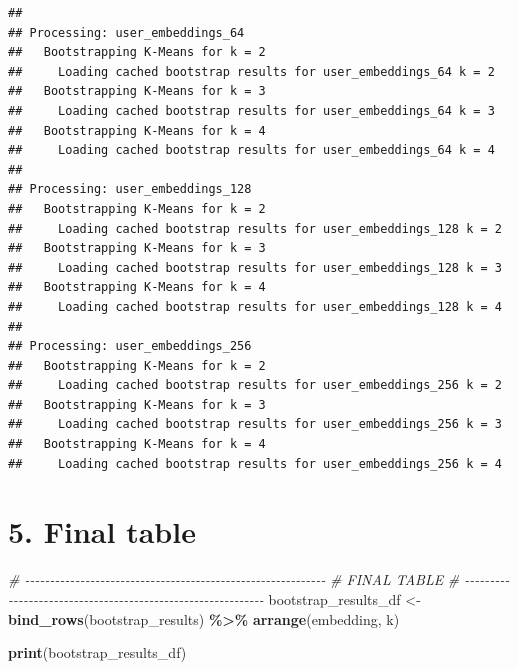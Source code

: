 \documentclass[
  11pt,
]{article}
\newenvironment{Shaded}{\begin{snugshade}}{\end{snugshade}}
\newcommand{\CommentTok}[1]{\textcolor[rgb]{0.56,0.35,0.01}{\textit{#1}}}
\newcommand{\FunctionTok}[1]{\textcolor[rgb]{0.13,0.29,0.53}{\textbf{#1}}}
\newcommand{\NormalTok}[1]{#1}
\newcommand{\OtherTok}[1]{\textcolor[rgb]{0.56,0.35,0.01}{#1}}
\newcommand{\SpecialCharTok}[1]{\textcolor[rgb]{0.81,0.36,0.00}{\textbf{#1}}}
\begin{document}
\begin{verbatim}
## 
## Processing: user_embeddings_64 
##   Bootstrapping K-Means for k = 2 
##     Loading cached bootstrap results for user_embeddings_64 k = 2 
##   Bootstrapping K-Means for k = 3 
##     Loading cached bootstrap results for user_embeddings_64 k = 3 
##   Bootstrapping K-Means for k = 4 
##     Loading cached bootstrap results for user_embeddings_64 k = 4 
## 
## Processing: user_embeddings_128 
##   Bootstrapping K-Means for k = 2 
##     Loading cached bootstrap results for user_embeddings_128 k = 2 
##   Bootstrapping K-Means for k = 3 
##     Loading cached bootstrap results for user_embeddings_128 k = 3 
##   Bootstrapping K-Means for k = 4 
##     Loading cached bootstrap results for user_embeddings_128 k = 4 
## 
## Processing: user_embeddings_256 
##   Bootstrapping K-Means for k = 2 
##     Loading cached bootstrap results for user_embeddings_256 k = 2 
##   Bootstrapping K-Means for k = 3 
##     Loading cached bootstrap results for user_embeddings_256 k = 3 
##   Bootstrapping K-Means for k = 4 
##     Loading cached bootstrap results for user_embeddings_256 k = 4
\end{verbatim}

\section{5. Final table}\label{final-table}

\begin{Shaded}
\begin{Highlighting}[]
\CommentTok{\# {-}{-}{-}{-}{-}{-}{-}{-}{-}{-}{-}{-}{-}{-}{-}{-}{-}{-}{-}{-}{-}{-}{-}{-}{-}{-}{-}{-}{-}{-}{-}{-}{-}{-}{-}{-}{-}{-}{-}{-}{-}{-}{-}{-}{-}{-}{-}{-}{-}{-}{-}{-}{-}{-}{-}{-}{-}{-}{-}{-}}
\CommentTok{\# FINAL TABLE}
\CommentTok{\# {-}{-}{-}{-}{-}{-}{-}{-}{-}{-}{-}{-}{-}{-}{-}{-}{-}{-}{-}{-}{-}{-}{-}{-}{-}{-}{-}{-}{-}{-}{-}{-}{-}{-}{-}{-}{-}{-}{-}{-}{-}{-}{-}{-}{-}{-}{-}{-}{-}{-}{-}{-}{-}{-}{-}{-}{-}{-}{-}{-}}
\NormalTok{bootstrap\_results\_df }\OtherTok{\textless{}{-}} \FunctionTok{bind\_rows}\NormalTok{(bootstrap\_results) }\SpecialCharTok{\%\textgreater{}\%}
  \FunctionTok{arrange}\NormalTok{(embedding, k)}

\FunctionTok{print}\NormalTok{(bootstrap\_results\_df)}
\end{Highlighting}
\end{Shaded}
\end{document}
